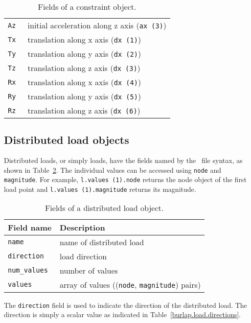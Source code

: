 {\begin{table}[htbp]
\begin{center}
\begin{tabular}{l|l}
\tt Az		& initial acceleration along z axis ({\tt ax (3)})	\\
\tt Tx		& translation along x axis ({\tt dx (1)})		\\
\tt Ty		& translation along y axis ({\tt dx (2)})		\\
\tt Tz		& translation along z axis ({\tt dx (3)})		\\
\tt Rx		& translation along x axis ({\tt dx (4)})		\\
\tt Ry		& translation along y axis ({\tt dx (5)})		\\
\tt Rz		& translation along z axis ({\tt dx (6)})		\\
\end{tabular}
\caption{Fields of a constraint object.}
\label{burlap.constraint.fields}
\end{center}
\end{table}}


\subsection{Distributed load objects}

Distributed loads, or simply loads, have the fields named by the
\felt\ file syntax, as shown in Table~\ref{burlap.load.fields}.  The
individual values can be accessed using {\tt node} and {\tt
magnitude}.  For example, {\tt l.values (1).node} returns the node
object of the first load point and {\tt l.values (1).magnitude}
returns its magnitude.

{\scriptsize
\begin{table}[htbp]
\begin{center}
\begin{tabular}{l|l}
Field name	& Description						\\
\hline
\tt name	& name of distributed load				\\
\tt direction	& load direction					\\
\tt num\_values	& number of values					\\
\tt values	& array of values (({\tt node}, {\tt magnitude}) pairs)	\\
\end{tabular}
\caption{Fields of a distributed load object.}
\label{burlap.load.fields}
\end{center}
\end{table}}

The {\tt direction} field is used to indicate the direction of the
distributed load.  The direction is simply a scalar value as indicated
in Table~\ref{burlap.load.directions}.

